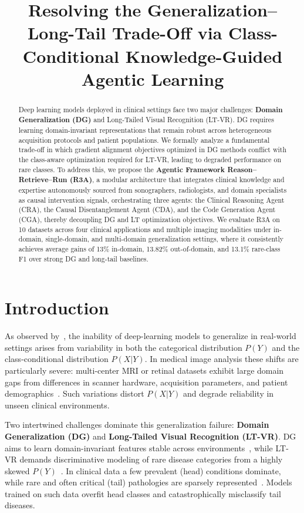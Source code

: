 \documentclass{article}
\title{Resolving the Generalization–Long-Tail Trade-Off via Class-Conditional Knowledge-Guided Agentic Learning}
\begin{document}
\maketitle
\begin{abstract}
Deep learning models deployed in clinical settings face two major challenges: \textbf{Domain Generalization (DG)} and Long-Tailed Visual Recognition (LT-VR). DG requires learning domain-invariant representations that remain robust across heterogeneous acquisition protocols and patient populations. We formally analyze a fundamental trade-off in which gradient alignment objectives optimized in DG methods conflict with the class-aware optimization required for LT-VR, leading to degraded performance on rare classes. To address this, we propose the \textbf{Agentic Framework Reason–Retrieve–Run (R3A)}, a modular architecture that integrates clinical knowledge and expertise autonomously sourced from sonographers, radiologists, and domain specialists as causal intervention signals, orchestrating three agents: the Clinical Reasoning Agent (CRA), the Causal Disentanglement Agent (CDA), and the Code Generation Agent (CGA), thereby decoupling DG and LT optimization objectives. We evaluate R3A on 10 datasets across four clinical applications and multiple imaging modalities under in-domain, single-domain, and multi-domain generalization settings, where it consistently achieves average gains of 13\% in-domain, 13.82\% out-of-domain, and 13.1\% rare-class F1 over strong DG and long-tail baselines.
\end{abstract}
\section{Introduction}
\label{sec:intro}

As observed by~\cite{Gu22}, the inability of deep-learning models to
generalize in real-world settings arises from variability in both the
categorical distribution $P(Y)$ and the class-conditional distribution
$P(X|Y)$. In medical image analysis these shifts are particularly severe:
multi-center MRI or retinal datasets exhibit large domain gaps from differences
in scanner hardware, acquisition parameters, and patient
demographics~\cite{Lei22, Chen23}. Such variations distort $P(X|Y)$ and
degrade reliability in unseen clinical environments.

Two intertwined challenges dominate this generalization failure:
\textbf{Domain Generalization (DG)} and \textbf{Long-Tailed Visual Recognition
(LT-VR)}. DG aims to learn domain-invariant features stable across
environments~\cite{Wang21}, while LT-VR demands discriminative modeling of
rare disease categories from a highly skewed $P(Y)$~\cite{Zhang21, Li18}. In
clinical data a few prevalent (head) conditions dominate, while rare and
often critical (tail) pathologies are sparsely represented~\cite{CXR24}.
Models trained on such data overfit head classes and catastrophically
misclassify tail diseases.
\end{document}
